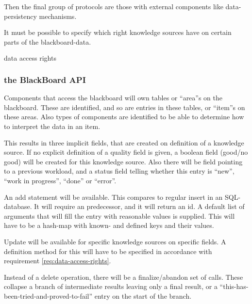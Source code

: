 \documentclass[]{lofar}
\begin{document}
      Then the final group of protocols are those with external
      components like data-persistency mechanisms.

      \begin{requirement}
        It must be possible to specify which right knowledge sources
        have on certain parts of the blackboard-data.
        \caption{data access rights\label{req:data-access-rights}}
        \hypertarget{req:data-access-rights}{}
      \end{requirement}

      \subsubsection{the BlackBoard API}

        Components that access the blackboard will own tables or
        ``area''s on the blackboard. These are identified, and so are
        entries in these tables, or ``item''s on these areas. Also
        types of components are identified to be able to determine how
        to interpret the data in an item.

        This results in three implicit fields, that are created on
        definition of a knowledge source. If no explicit definition of
        a quality field is given, a boolean field (good/no good) will
        be created for this knowledge source. Also there will be field
        pointing to a previous workload, and a status field telling
        whether this entry is ``new'', ``work in progress'', ``done''
        or ``error''.

        An add statement will be available. This compares to regular
        insert in an SQL-database. It will require
        an predecessor, and it will return an id. A default list of
        arguments that will fill the entry with reasonable values is
        supplied. This will have to be a hash-map with known- and
        defined keys and their values.

        Update will be available for specific knowledge sources on
        specific fields. A definition method for this will have to be
        specified in accordance with requirement
        \hyperlink{req:data-access-rights}{\ref{req:data-access-rights}}.

        Instead of a delete operation, there will be a
        finalize/abandon set of calls. These collapse a branch of
        intermediate results leaving only a final result, or a
        ``this-has-been-tried-and-proved-to-fail'' entry on the start
        of the branch.
\end{document}
